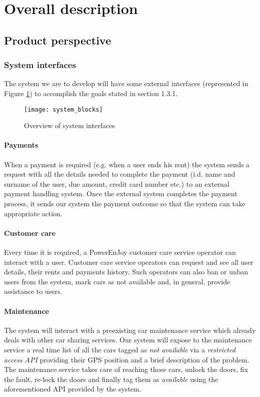 \section{Overall description}
\subsection{Product perspective}
	\subsubsection{System interfaces}
	\label{sec:systemInterfaces}
		The system we are to develop will have some external interfaces (represented in Figure \ref{fig:systemInterfaces}) to accomplish the goals stated in section 1.3.1.
		\begin{figure}[h]
			\centering
			\texttt{[image: system\_blocks]}
			\caption{
				\label{fig:systemInterfaces} 
				Overview of system interfaces
			}
		\end{figure}
	\paragraph{Payments}
	When a payment is required (e.g. when a user ends his rent) the system sends a request with all the details needed to complete the payment (i.d. name and surname of the user, due amount, credit card number etc.) to an external payment handling system. Once the external system completes the payment process, it sends our system the payment outcome so that the system can take appropriate action.
	
	\paragraph{Customer care} Every time it is required, a PowerEnJoy customer care service operator can interact with a user. Customer care service operators can request and see all user details, their rents and payments history. Such operators can also ban or unban users from the system, mark cars as not available and, in general, provide assistance to users.

	\paragraph{Maintenance} The system will interact with a preexisting car maintenance service which already deals with other car sharing services. Our system will expose to the maintenance service a real time list of all the cars tagged as \emph{not available} via a \emph{restricted access API} providing their GPS position and a brief description of the problem. The maintenance service takes care of reaching those cars, unlock the doors,  fix the fault, re-lock the doors and finally tag them as \emph{available} using the aforementioned API provided by the system.
	
